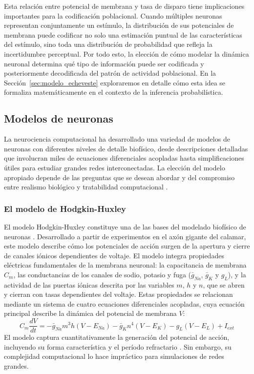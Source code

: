 Esta relación entre potencial de membrana y tasa de disparo tiene implicaciones importantes para la codificación poblacional. Cuando múltiples neuronas representan conjuntamente un estímulo, la distribución de sus potenciales de membrana puede codificar no solo una estimación puntual de las características del estímulo, sino toda una distribución de probabilidad que refleja la incertidumbre perceptual. Por todo esto, la elección de cómo modelar la dinámica neuronal determina qué tipo de información puede ser codificada y posteriormente decodificada del patrón de actividad poblacional. En la Sección~\ref{sec:modelo_echeveste} exploraremos en detalle cómo esta idea se formaliza matemáticamente en el contexto de la inferencia probabilística.

\subsection{Modelos de neuronas}
\label{subsec:modelos_neuronas}

La neurociencia computacional ha desarrollado una variedad de modelos de neuronas con diferentes niveles de detalle biofísico, desde descripciones detalladas que involucran miles de ecuaciones diferenciales acopladas hasta simplificaciones útiles para estudiar grandes redes interconectadas. La elección del modelo apropiado depende de las preguntas que se desean abordar y del compromiso entre realismo biológico y tratabilidad computacional \citep{dayan2005theoretical}.

\subsubsection{El modelo de Hodgkin-Huxley}
\label{subsec:Hodgkin-Huxley}

El modelo Hodgkin-Huxley constituye una de las bases del modelado biofísico de neuronas \citep{hodgkin1952quantitative}. Desarrollado a partir de experimentos en el axón gigante del calamar, este modelo describe cómo los potenciales de acción surgen de la apertura y cierre de canales iónicos dependientes de voltaje. El modelo integra propiedades eléctricas fundamentales de la membrana neuronal: la capacitancia de membrana $C_m$, las conductancias de los canales de sodio, potasio y fuga ($\bar{g}_{Na}$, $\bar{g}_K$ y $g_L$), y la actividad de las puertas iónicas descrita por las variables $m$, $h$ y $n$, que se abren y cierran con tasas dependientes del voltaje. Estas propiedades se relacionan mediante un sistema de cuatro ecuaciones diferenciales acopladas, cuya ecuación principal describe la dinámica del potencial de membrana $V$:
\begin{equation}
C_m \frac{dV}{dt} = -\bar{g}_{Na}m^3h(V-E_{Na}) - \bar{g}_K n^4(V-E_K) - g_{L}(V-E_{L}) + I_{ext}
\label{eq:hodgkin_huxley}
\end{equation}
El modelo captura cuantitativamente la generación del potencial de acción, incluyendo su forma característica y el período refractario \citep{dayan2005theoretical}. Sin embargo, su complejidad computacional lo hace impráctico para simulaciones de redes grandes.

